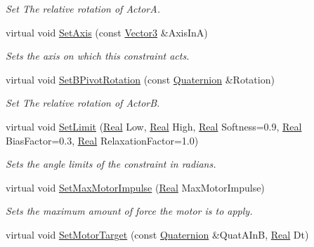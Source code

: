 \begin{DoxyCompactItemize}
\begin{DoxyCompactList}\small\item\em Set The relative rotation of ActorA. \item\end{DoxyCompactList}\item 
virtual void \hyperlink{classphys_1_1HingeConstraint_a4eb0343f43b86fabef1fbe43857f9df8}{SetAxis} (const \hyperlink{classphys_1_1Vector3}{Vector3} \&AxisInA)
\begin{DoxyCompactList}\small\item\em Sets the axis on which this constraint acts. \item\end{DoxyCompactList}\item 
virtual void \hyperlink{classphys_1_1HingeConstraint_ae7c0db15c76fa1f7d78ca60d3c7368cd}{SetBPivotRotation} (const \hyperlink{classphys_1_1Quaternion}{Quaternion} \&Rotation)
\begin{DoxyCompactList}\small\item\em Set The relative rotation of ActorB. \item\end{DoxyCompactList}\item 
virtual void \hyperlink{classphys_1_1HingeConstraint_a2267ee2b124aae7a35d70f48831548bc}{SetLimit} (\hyperlink{namespacephys_af7eb897198d265b8e868f45240230d5f}{Real} Low, \hyperlink{namespacephys_af7eb897198d265b8e868f45240230d5f}{Real} High, \hyperlink{namespacephys_af7eb897198d265b8e868f45240230d5f}{Real} Softness=0.9, \hyperlink{namespacephys_af7eb897198d265b8e868f45240230d5f}{Real} BiasFactor=0.3, \hyperlink{namespacephys_af7eb897198d265b8e868f45240230d5f}{Real} RelaxationFactor=1.0)
\begin{DoxyCompactList}\small\item\em Sets the angle limits of the constraint in radians. \item\end{DoxyCompactList}\item 
virtual void \hyperlink{classphys_1_1HingeConstraint_a3fa9ac9e2ea08df81fdd89711131deef}{SetMaxMotorImpulse} (\hyperlink{namespacephys_af7eb897198d265b8e868f45240230d5f}{Real} MaxMotorImpulse)
\begin{DoxyCompactList}\small\item\em Sets the maximum amount of force the motor is to apply. \item\end{DoxyCompactList}\item 
virtual void \hyperlink{classphys_1_1HingeConstraint_ae3038cabdde1b676c0e6b9665807c917}{SetMotorTarget} (const \hyperlink{classphys_1_1Quaternion}{Quaternion} \&QuatAInB, \hyperlink{namespacephys_af7eb897198d265b8e868f45240230d5f}{Real} Dt)

\end{DoxyCompactItemize}
